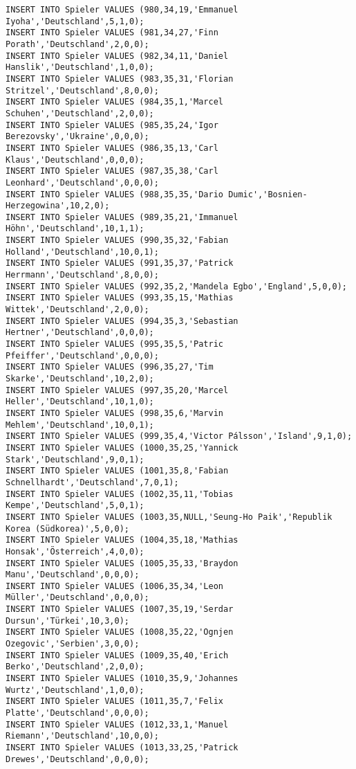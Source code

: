 \documentclass{lehramt-informatik-aufgabe}
\begin{document}
\begin{verbatim}
INSERT INTO Spieler VALUES (980,34,19,'Emmanuel Iyoha','Deutschland',5,1,0);
INSERT INTO Spieler VALUES (981,34,27,'Finn Porath','Deutschland',2,0,0);
INSERT INTO Spieler VALUES (982,34,11,'Daniel Hanslik','Deutschland',1,0,0);
INSERT INTO Spieler VALUES (983,35,31,'Florian Stritzel','Deutschland',8,0,0);
INSERT INTO Spieler VALUES (984,35,1,'Marcel Schuhen','Deutschland',2,0,0);
INSERT INTO Spieler VALUES (985,35,24,'Igor Berezovsky','Ukraine',0,0,0);
INSERT INTO Spieler VALUES (986,35,13,'Carl Klaus','Deutschland',0,0,0);
INSERT INTO Spieler VALUES (987,35,38,'Carl Leonhard','Deutschland',0,0,0);
INSERT INTO Spieler VALUES (988,35,35,'Dario Dumic','Bosnien-Herzegowina',10,2,0);
INSERT INTO Spieler VALUES (989,35,21,'Immanuel Höhn','Deutschland',10,1,1);
INSERT INTO Spieler VALUES (990,35,32,'Fabian Holland','Deutschland',10,0,1);
INSERT INTO Spieler VALUES (991,35,37,'Patrick Herrmann','Deutschland',8,0,0);
INSERT INTO Spieler VALUES (992,35,2,'Mandela Egbo','England',5,0,0);
INSERT INTO Spieler VALUES (993,35,15,'Mathias Wittek','Deutschland',2,0,0);
INSERT INTO Spieler VALUES (994,35,3,'Sebastian Hertner','Deutschland',0,0,0);
INSERT INTO Spieler VALUES (995,35,5,'Patric Pfeiffer','Deutschland',0,0,0);
INSERT INTO Spieler VALUES (996,35,27,'Tim Skarke','Deutschland',10,2,0);
INSERT INTO Spieler VALUES (997,35,20,'Marcel Heller','Deutschland',10,1,0);
INSERT INTO Spieler VALUES (998,35,6,'Marvin Mehlem','Deutschland',10,0,1);
INSERT INTO Spieler VALUES (999,35,4,'Victor Pálsson','Island',9,1,0);
INSERT INTO Spieler VALUES (1000,35,25,'Yannick Stark','Deutschland',9,0,1);
INSERT INTO Spieler VALUES (1001,35,8,'Fabian Schnellhardt','Deutschland',7,0,1);
INSERT INTO Spieler VALUES (1002,35,11,'Tobias Kempe','Deutschland',5,0,1);
INSERT INTO Spieler VALUES (1003,35,NULL,'Seung-Ho Paik','Republik Korea (Südkorea)',5,0,0);
INSERT INTO Spieler VALUES (1004,35,18,'Mathias Honsak','Österreich',4,0,0);
INSERT INTO Spieler VALUES (1005,35,33,'Braydon Manu','Deutschland',0,0,0);
INSERT INTO Spieler VALUES (1006,35,34,'Leon Müller','Deutschland',0,0,0);
INSERT INTO Spieler VALUES (1007,35,19,'Serdar Dursun','Türkei',10,3,0);
INSERT INTO Spieler VALUES (1008,35,22,'Ognjen Ozegovic','Serbien',3,0,0);
INSERT INTO Spieler VALUES (1009,35,40,'Erich Berko','Deutschland',2,0,0);
INSERT INTO Spieler VALUES (1010,35,9,'Johannes Wurtz','Deutschland',1,0,0);
INSERT INTO Spieler VALUES (1011,35,7,'Felix Platte','Deutschland',0,0,0);
INSERT INTO Spieler VALUES (1012,33,1,'Manuel Riemann','Deutschland',10,0,0);
INSERT INTO Spieler VALUES (1013,33,25,'Patrick Drewes','Deutschland',0,0,0);

\end{verbatim}
\end{document}
